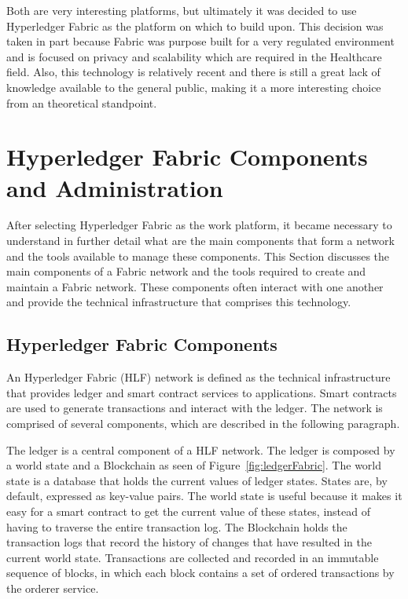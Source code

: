 Both are very interesting platforms, but ultimately it was decided to use
Hyperledger Fabric as the platform on which to build upon. This decision was
taken in part because Fabric was purpose built for a very regulated environment
and is focused on privacy and scalability which are required in the Healthcare
field. Also, this technology is relatively recent and there is still a great
lack of knowledge available to the general public, making it a more interesting
choice from an theoretical standpoint.

\section{Hyperledger Fabric Components and Administration}

After selecting Hyperledger Fabric as the work platform, it became necessary to
understand in further detail what are the main components that form a network
and the tools available to manage these components. This Section discusses the
main components of a Fabric network and the tools required to create and
maintain a Fabric network. These components often interact with one another and
provide the technical infrastructure that comprises this technology.

\subsection{Hyperledger Fabric Components}

An Hyperledger Fabric (HLF) network is defined as the technical infrastructure
that provides ledger and smart contract services to applications. Smart
contracts are used to generate transactions and interact with the ledger. The
network is comprised of several components, which are described in the
following paragraph.

The ledger is a central component of a HLF network. The ledger is composed by a
world state and a Blockchain as seen of Figure~\ref{fig:ledgerFabric}. The
world state is a database that holds the current values of ledger states.
States are, by default, expressed as key-value pairs. The world state is useful
because it makes it easy for a smart contract to get the current value of these
states, instead of having to traverse the entire transaction log. The
Blockchain holds the transaction logs that record the history of changes that
have resulted in the current world state.  Transactions are collected and
recorded in an immutable sequence of blocks, in which each block contains a set
of ordered transactions by the orderer service.


